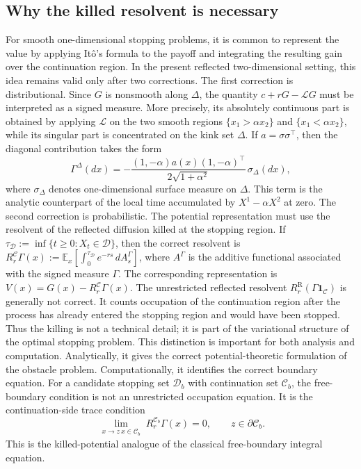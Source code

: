 \documentclass[pdflatex,sn-mathphys-num]{sn-jnl}
\theoremstyle{plain}
\theoremstyle{definition}
\theoremstyle{remark}
\numberwithin{equation}{section}
\begin{document}
\subsection{Why the killed resolvent is necessary} \label{subsec:intro-killed-resolvent} 

For smooth one-dimensional stopping problems, it is common to represent the value by applying It\^{o}'s formula to the payoff and integrating the resulting gain over the continuation region. In the present reflected two-dimensional setting, this idea remains valid only after two corrections. The first correction is distributional. Since \(G\) is nonsmooth along \(\Delta\), the quantity \(c+rG-\mathcal LG\) must be interpreted as a signed measure. More precisely, its absolutely continuous part is obtained by applying \(\mathcal L\) on the two smooth regions 
$\{x_1>\alpha x_2\}$ and $\{x_1<\alpha x_2\}$, while its singular part is concentrated on the kink set \(\Delta\). If \(a=\sigma\sigma^\top\), then the diagonal contribution takes the form 
\begin{equation} \label{eq:intro-diagonal-measure} 
\Gamma^\Delta(dx) = -\frac{(1,-\alpha)a(x)(1,-\alpha)^\top} {2\sqrt{1+\alpha^2}}\,\sigma_\Delta(dx), 
\end{equation} 
where \(\sigma_\Delta\) denotes one-dimensional surface measure on \(\Delta\). This term is the analytic counterpart of the local time accumulated by \(X^1-\alpha X^2\) at zero. The second correction is probabilistic. The potential representation must use the resolvent of the reflected diffusion killed at the stopping region. If 
$\displaystyle \tau_{\mathcal D}:=\inf\{t\ge0:X_t\in\mathcal D\}$, 
then the correct resolvent is 
$\displaystyle R_r^{\mathcal C}\Gamma(x) := \mathbb E_x\left[ \int_0^{\tau_{\mathcal D}} e^{-rs}\,dA_s^\Gamma \right]$, 
where \(A^\Gamma\) is the additive functional associated with the signed measure \(\Gamma\). The corresponding representation is 
$\displaystyle V(x)=G(x)-R_r^{\mathcal C}\Gamma(x)$. 
The unrestricted reflected resolvent 
$\displaystyle R_r^{\mathrm R}(\Gamma\mathbf 1_{\mathcal C})$
is generally not correct. It counts occupation of the continuation region after the process has already entered the stopping region and would have been stopped. Thus the killing is not a technical detail; it is part of the variational structure of the optimal stopping problem. This distinction is important for both analysis and computation. Analytically, it gives the correct potential-theoretic formulation of the obstacle problem. Computationally, it identifies the correct boundary equation. For a candidate stopping set \(\mathcal D_b\) with continuation set \(\mathcal C_b\), the free-boundary condition is not an unrestricted occupation equation. It is the continuation-side trace condition 
\[
\lim_{\substack{x\to z\ x\in\mathcal C_b}} R_r^{\mathcal C_b}\Gamma(x)=0, \qquad z\in\partial\mathcal C_b . 
\]
This is the killed-potential analogue of the classical free-boundary integral equation. 
\end{document}
